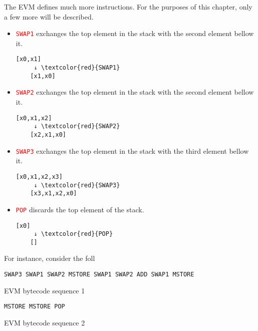 The EVM defines much more instructions. For the purposes of this chapter, only a few
more will be described.
\begin{itemize}
    \item \textcolor{red}{\texttt{SWAP1}} exchanges the top element in the stack with the
    second element bellow it.
    \begin{Verbatim}[commandchars=\\\{\}]
    [x0,x1]
     ↓ \textcolor{red}{SWAP1}
    [x1,x0]
    \end{Verbatim}

    \item \textcolor{red}{\texttt{SWAP2} } exchanges the top element in the stack with the
    second element bellow it.
    \begin{Verbatim}[commandchars=\\\{\}]
    [x0,x1,x2]
     ↓ \textcolor{red}{SWAP2}
    [x2,x1,x0]
    \end{Verbatim}

    \item \textcolor{red}{\texttt{SWAP3}} exchanges the top element in the stack with the
    third element bellow it.
    \begin{Verbatim}[commandchars=\\\{\}]
    [x0,x1,x2,x3]
     ↓ \textcolor{red}{SWAP3}
    [x3,x1,x2,x0]
    \end{Verbatim}

    \item \textcolor{red}{\texttt{POP}} discards the top element of the stack.
    \begin{Verbatim}[commandchars=\\\{\}]
    [x0] 
     ↓ \textcolor{red}{POP}
    []
    \end{Verbatim}
\end{itemize}


For instance, consider the foll %

\begin{listing}[!ht]
{\color{red}
\begin{verbatim}
SWAP3 SWAP1 SWAP2 MSTORE SWAP1 SWAP2 ADD SWAP1 MSTORE
\end{verbatim}
}
\caption{EVM bytecode sequence 1}
\label{lst:evm-original}
\end{listing}

\begin{listing}[!ht]
{\color{red}
\begin{verbatim}
MSTORE MSTORE POP 
\end{verbatim}
}
\caption{EVM bytecode sequence 2}
\label{lst:evm-optimized}
\end{listing}

